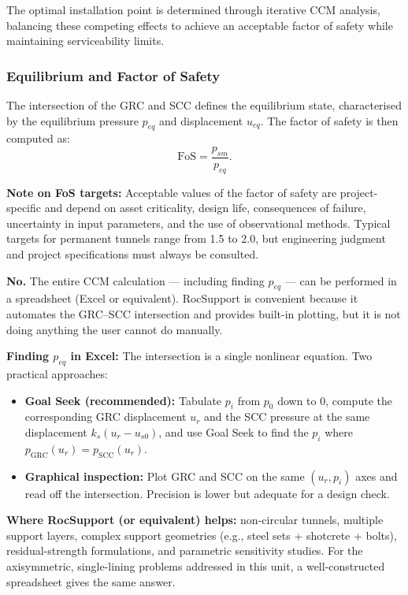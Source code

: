 \documentclass[a4paper,12pt]{article}
\begin{document}
The optimal installation point is determined through iterative CCM analysis, balancing these competing effects to achieve an acceptable factor of safety while maintaining serviceability limits.

\subsubsection{Equilibrium and Factor of Safety}
The intersection of the GRC and SCC defines the equilibrium state, characterised by the equilibrium pressure $p_{eq}$ and displacement $u_{eq}$. The factor of safety is then computed as:
\[
\text{FoS} = \frac{p_{sm}}{p_{eq}}.
\]

\textbf{Note on FoS targets:} Acceptable values of the factor of safety are project-specific and depend on asset criticality, design life, consequences of failure, uncertainty in input parameters, and the use of observational methods. Typical targets for permanent tunnels range from 1.5 to 2.0, but engineering judgment and project specifications must always be consulted.

\begin{notebox}
\textbf{No.} The entire CCM calculation --- including finding $p_{eq}$ --- can be performed in a spreadsheet (Excel or equivalent). RocSupport is convenient because it automates the GRC--SCC intersection and provides built-in plotting, but it is not doing anything the user cannot do manually.

\vspace{0.5em}


\textbf{Finding $p_{eq}$ in Excel:} The intersection is a single nonlinear equation. Two practical approaches:
\begin{itemize}[nosep]
    \item \textbf{Goal Seek (recommended):} Tabulate $p_i$ from $p_0$ down to $0$, compute the corresponding GRC displacement $u_r$ and the SCC pressure at the same displacement $k_s(u_r - u_{s0})$, and use Goal Seek to find the $p_i$ where $p_{\mathrm{GRC}}(u_r) = p_{\mathrm{SCC}}(u_r)$.
    \item \textbf{Graphical inspection:} Plot GRC and SCC on the same $(u_r, p_i)$ axes and read off the intersection. Precision is lower but adequate for a design check.
\end{itemize}
\vspace{0.5em}

\textbf{Where RocSupport (or equivalent) helps:} non-circular tunnels, multiple support layers, complex support geometries (e.g., steel sets + shotcrete + bolts), residual-strength formulations, and parametric sensitivity studies. For the axisymmetric, single-lining problems addressed in this unit, a well-constructed spreadsheet gives the same answer.
\end{notebox}
\end{document}
